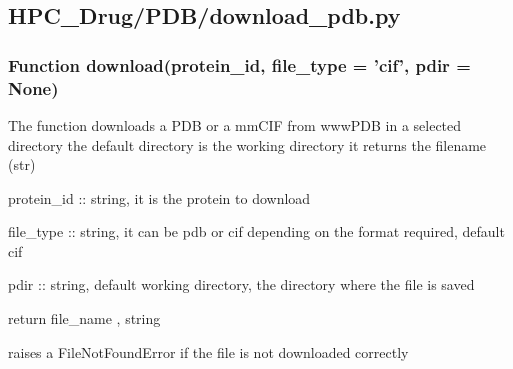 

\subsection{HPC\_Drug/PDB/download\_pdb.py}

    \subsubsection{Function download(protein\_id, file\_type = 'cif', pdir = None)}

        The function downloads a PDB or a mmCIF from wwwPDB in a selected directory
        the default directory is the working directory
        it returns the filename (str)
        
        protein\_id :: string, it is the protein to download
        
        file\_type :: string, it can be pdb or cif depending on the format required, default cif
        
        pdir :: string, default working directory, the directory where the file is saved
        
        return file\_name , string
        
        raises a FileNotFoundError if the file is not downloaded correctly